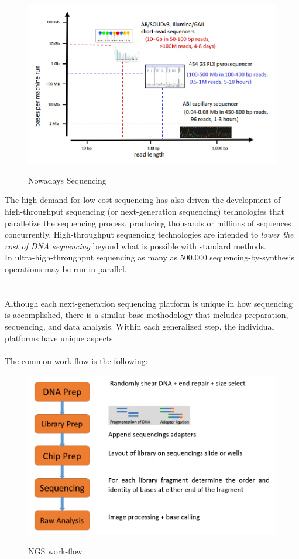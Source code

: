\vspace{30mm}

\begin{figure}[ht!]
	\centering
	\includegraphics[width=150mm]{../Images/NowadaysSequencing.png}
	\label{overflow}
	\caption{Nowadays Sequencing}
	\end{figure}

The high demand for low-cost sequencing has also driven the development of high-throughput sequencing (or next-generation sequencing) technologies that parallelize the sequencing process, producing thousands or millions of sequences concurrently. High-throughput sequencing technologies are intended to \emph{lower the cost of DNA sequencing} beyond what is possible with standard methods.
\\In ultra-high-throughput sequencing as many as 500,000 sequencing-by-synthesis operations may be run in parallel.
\\
\\
\\Although each next-generation sequencing platform is unique in how sequencing is accomplished, there is a similar base methodology that includes preparation, sequencing, and data analysis. Within each generalized step, the individual platforms have unique aspects.
\\
\\The common work-flow is the following:

\begin{figure}[ht!]
	\centering
	\includegraphics[width=150mm]{../Images/NGSworkflowCommented.png}
	\label{overflow}
	\caption{NGS work-flow}
	\end{figure}


